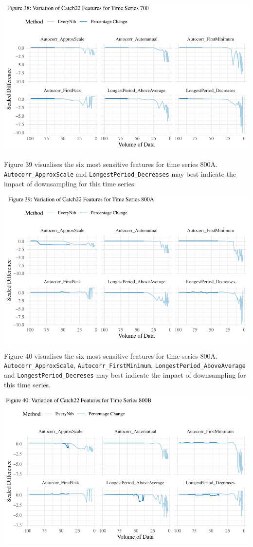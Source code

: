\documentclass{article}
\begin{document}
\includegraphics{210431461_CSC8639_Dissertation_files/figure-latex/Catch22Variation700-1.pdf}

\newpage

Figure 39 visualises the six most sensitive features for time series
800A. \texttt{Autocorr\_ApproxScale} and
\texttt{LongestPeriod\_Decreases} may best indicate the impact of
downsampling for this time series.

\includegraphics{210431461_CSC8639_Dissertation_files/figure-latex/Catch22Variation800A-1.pdf}

Figure 40 visualises the six most sensitive features for time series
800A. \texttt{Autocorr\_ApproxScale}, \texttt{Autocorr\_FirstMinimum},
\texttt{LongestPeriod\_AboveAverage} and
\texttt{LongestPeriod\_Decreses} may best indicate the impact of
downsampling for this time series.

\includegraphics{210431461_CSC8639_Dissertation_files/figure-latex/Catch22Variation800B-1.pdf}
\end{document}
